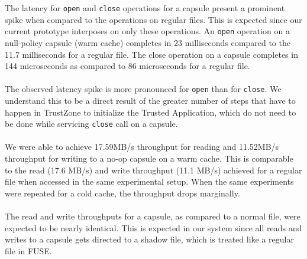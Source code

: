 The latency for \texttt{open} and \texttt{close} operations for a capsule present a prominent spike when compared to the operations on regular files. This is expected since our current prototype interposes on only these operations. An \texttt{open} operation on a null-policy capsule (warm cache) completes in 23 milliseconds compared to the 11.7 milliseconds for a regular file. The close operation on a capsule completes in  144 microseconds as compared to  86 microseconds for a regular file. 
\\\\
The observed latency spike is more pronounced for \texttt{open} than for \texttt{close}. We understand this to be a direct result of the greater number of steps that have to happen in TrustZone to initialize the Trusted Application, which do not need to be done  while servicing  \texttt{close} call on a capsule. 
\\\\
We were able to achieve 17.59MB/s throughput for reading and 11.52MB/s throughput for writing to a no-op capsule on a warm cache. This is comparable to the read (17.6 MB/s) and write throughput (11.1 MB/s) achieved for a regular file when accessed in the same experimental setup. When the same experiments were repeated for a cold cache, the throughput drops marginally.
\\\\
The read and write throughputs for a capsule, as compared to a normal
file, were expected to be nearly identical. This is expected in our
system since all reads and writes to a capsule gets directed to a
shadow file, which is treated like a regular file in FUSE.




